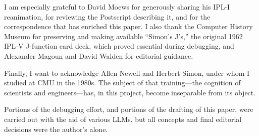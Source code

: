 \documentclass[journal]{IEEEtran}
\begin{document}
I am especially grateful to David Moews for generously sharing his
IPL-I reanimation, for reviewing the Postscript describing it, and for
the correspondence that has enriched this paper. I also thank the
Computer History Museum for preserving and making available ``Simon's
J's,'' the original 1962 IPL-V J-function card deck, which proved
essential during debugging, and Alexander Magoun and David Walden for
editorial guidance.

Finally, I want to acknowledge Allen Newell and Herbert Simon, under
whom I studied at CMU in the 1980s. The subject of that
training---the cognition of scientists and engineers---has, in this
project, become inseparable from its object.

{\footnotesize Portions of the debugging effort, and portions of the
drafting of this paper, were carried out with the aid of various LLMs,
but all concepts and final editorial decisions were the author's
alone.}
\end{document}
